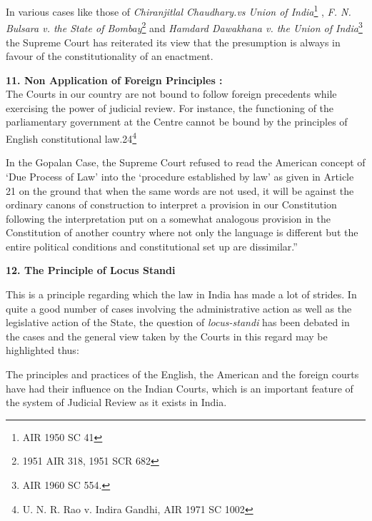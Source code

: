 \begin{multicols}{2}
\noi
In various cases like those of \textit{Chiranjitlal Chaudhary.vs Union of India}\footnote{AIR 1950 SC 41}
, \textit{F. N. Bulsara
v. the State of Bombay}\footnote{ 1951 AIR 318, 1951 SCR 682} and \textit{Hamdard Dawakhana v. the Union of India}\footnote{AIR 1960 SC 554.} the Supreme
Court has reiterated its view that the presumption is always in favour of the
constitutionality of an enactment.

\noi
{\bf 11. Non Application of Foreign Principles :}\\[0.2cm]

\noi
The Courts in our country are not bound to follow foreign precedents while exercising
the power of judicial review. For instance, the functioning of the parliamentary
government at the Centre cannot be bound by the principles of English constitutional
law.24\footnote{ U. N. R. Rao v. Indira Gandhi, AIR 1971 SC 1002}

\noi
In the Gopalan Case, the Supreme Court refused to read the American concept of ‘Due
Process of Law’ into the ‘procedure established by law’ as given in Article 21 on the
ground that when the same words are not used, it will be against the ordinary canons of
construction to interpret a provision in our Constitution following the interpretation put
on a somewhat analogous provision in the Constitution of another country where not
only the language is different but the entire political conditions and constitutional set
up are dissimilar.”

\noi
{\bf 12. The Principle of Locus Standi}

\noi
This is a principle regarding which the law in India has made a lot of strides. In quite a
good number of cases involving the administrative action as well as the legislative
action of the State, the question of \textit{locus-standi} has been debated in the cases and the
general view taken by the Courts in this regard may be highlighted thus:

\noi
The principles and practices of the English, the American and the foreign courts have
had their influence on the Indian Courts, which is an important feature of the system of
Judicial Review as it exists in India.


\end{multicols}
